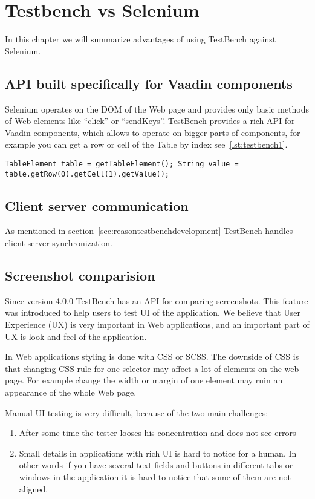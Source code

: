 \chapter{Testbench vs Selenium}
\label{ch:testbenchvsselenium}
In this chapter we will summarize advantages of using TestBench against
Selenium.

\section{API built specifically for Vaadin components}
Selenium operates on the DOM of the Web page and provides only basic methods of
Web elements like ``click'' or ``sendKeys''. TestBench provides a rich API for
Vaadin components, which allows to operate on bigger parts of components, for
 example you can get a row or cell of the Table by index
 see~\ref{lst:testbench1}.
  	\lstset{language=Java}
  	\begin{lstlisting}[caption=Get Vaadin Table cell Value,label={lst:testbench1}]
TableElement table = getTableElement(); String value = table.getRow(0).getCell(1).getValue();
	\end{lstlisting}
	
\section{Client server communication}
As mentioned in section~\ref{sec:reasontestbenchdevelopment} TestBench handles 
client server synchronization.

\section{Screenshot comparision}
\label{sec:screencompare}
Since version 4.0.0 TestBench has an API for comparing screenshots. This 
feature was introduced to help users to test UI of the application. We believe
that User Experience (UX) is very important in Web applications, and an
important part of UX is look and feel of the application.

In Web applications styling is done with CSS or SCSS. The downside of CSS 
is that changing CSS rule for one selector may affect a lot of elements on the
web page. For example change the width or margin of one element may ruin an
appearance of the whole Web page.

Manual UI testing is very difficult, because of the two main challenges:
\begin{enumerate}
  \item After some time the tester looses his concentration and does not see
  errors
  \item Small details in applications with rich UI is hard to notice for a
  human. In other words if you have several text fields and buttons in different
  tabs or windows in the application it is hard to notice that some of them are
  not aligned.
\end{enumerate}

